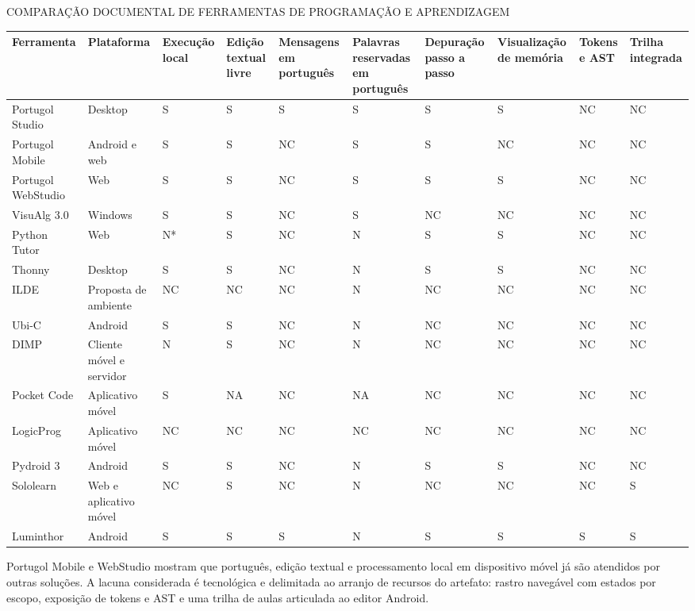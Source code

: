 \documentclass[
    12pt
    ,oneside
    ,a4paper
    ,chapter=TITLE
    ,section=TITLE
    ,sumario=abnt-6027-2012]{abntex2}
\renewcommand{\legenda}[2][]{%
    \centering
    \caption[\MakeTextUppercase{#2}]{\maybeLabel{#1}\MakeTextUppercase{#2}}%
}
\begin{document}
\begin{landscape}
\begin{quadro}[p]
\centering
\legenda[quad:relacionados]{Comparação documental de ferramentas de programação e aprendizagem}
\begingroup
\footnotesize
\setlength{\tabcolsep}{3pt}
\renewcommand{\arraystretch}{1.15}
\begin{tabular}{|P{2.4cm}|P{2.0cm}|P{1.6cm}|P{1.5cm}|P{1.95cm}|P{1.8cm}|P{1.85cm}|P{2.1cm}|P{1.6cm}|P{1.7cm}|}
\hline
Ferramenta & Plataforma & Execução local & Edição textual livre & Mensagens em português & Palavras reservadas em português & Depuração passo a passo & Visualização de memória & Tokens e AST & Trilha integrada \\
\hline\hline
Portugol Studio & Desktop & S & S & S & S & S & S & NC & NC \\
\hline
Portugol Mobile & Android e web & S & S & NC & S & S & NC & NC & NC \\
\hline
Portugol WebStudio & Web & S & S & NC & S & S & S & NC & NC \\
\hline
VisuAlg 3.0 & Windows & S & S & NC & S & NC & NC & NC & NC \\
\hline
Python Tutor & Web & N* & S & NC & N & S & S & NC & NC \\
\hline
Thonny & Desktop & S & S & NC & N & S & S & NC & NC \\
\hline
ILDE & Proposta de ambiente & NC & NC & NC & N & NC & NC & NC & NC \\
\hline
Ubi-C & Android & S & S & NC & N & NC & NC & NC & NC \\
\hline
DIMP & Cliente móvel e servidor & N & S & NC & N & NC & NC & NC & NC \\
\hline
Pocket Code & Aplicativo móvel & S & NA & NC & NA & NC & NC & NC & NC \\
\hline
LogicProg & Aplicativo móvel & NC & NC & NC & NC & NC & NC & NC & NC \\
\hline
Pydroid 3 & Android & S & S & NC & N & S & S & NC & NC \\
\hline
Sololearn & Web e aplicativo móvel & NC & S & NC & N & NC & NC & NC & S \\
\hline
Luminthor & Android & S & S & S & N & S & S & S & S \\
\hline
\end{tabular}
\endgroup
\vspace{0.2cm}
\end{quadro}
\end{landscape}

Portugol Mobile e WebStudio mostram que português, edição textual e processamento
local em dispositivo móvel já são atendidos por outras soluções. A lacuna
considerada é tecnológica e delimitada ao arranjo de recursos do artefato:
rastro navegável com estados por escopo, exposição de tokens e AST e uma trilha
de aulas articulada ao editor Android.
\end{document}
